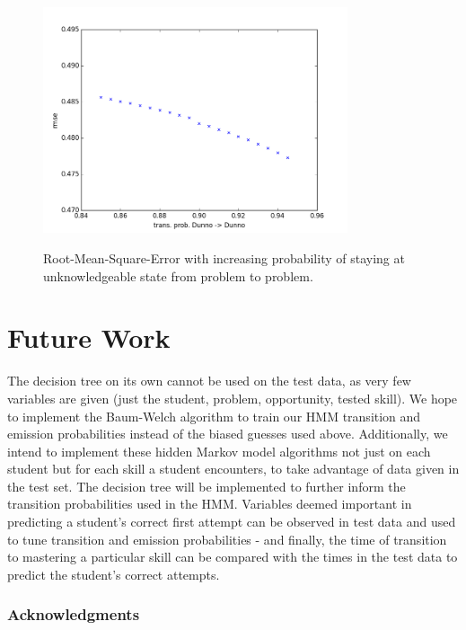 \documentclass{article} %
\begin{document}
\begin{figure}[h]
\begin{center}
\includegraphics[width=0.8\textwidth]{dunno.png}
\label{fig:dunno}
\end{center}
\caption{Root-Mean-Square-Error with increasing probability of staying at unknowledgeable state from problem to problem.}
\end{figure}

\section{Future Work}

The decision tree on its own cannot be used on the test data, as very few variables are given (just the student, problem, opportunity, tested skill). We hope to implement the Baum-Welch algorithm to train our HMM transition and emission probabilities instead of the biased guesses used above. Additionally, we intend to implement these hidden Markov model algorithms not just on each student but for each skill a student encounters, to take advantage of data given in the test set. The decision tree will be implemented to further inform the transition probabilities used in the HMM. Variables deemed important in predicting a student's correct first attempt can be observed in test data and used to tune transition and emission probabilities - and finally, the time of transition to mastering a particular skill can be compared with the times in the test data to predict the student's correct attempts.

\subsubsection*{Acknowledgments}
\end{document}
